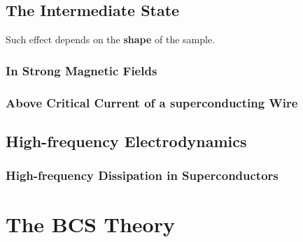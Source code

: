 \documentclass[8pt,a4paper,twocolumn]{article} %
\numberwithin{equation}{section} %
\begin{document}

			\subsection{The Intermediate State} %
			\label{sub:the_intermediate_state}
				Such effect depends on the \textbf{shape} of the sample.

				\subsubsection{In Strong Magnetic Fields} %
				\label{ssub:in_strong_magnetic_fields}
					

				\subsubsection{Above Critical Current of a superconducting Wire} %
				\label{ssub:above_critical_current_of_a_superconducting_wire}
					


			\subsection{High-frequency Electrodynamics} %
			\label{sub:high_frequency_electrodynamics}
				\subsubsection{High-frequency Dissipation in Superconductors} %
				\label{ssub:high_frequency_dissipation_in_superconductors}
				



	\section{The BCS Theory} %
	\label{sec:the_bcs_theory}
	
\end{document}
